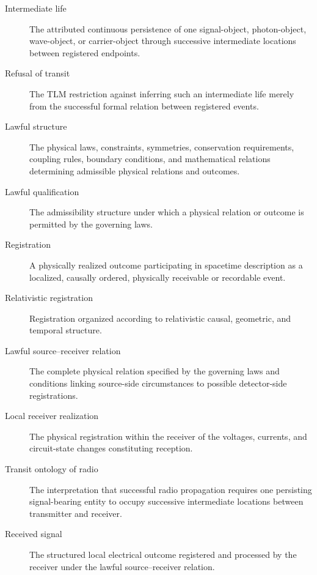 \documentclass[12pt,onecolumn]{article}
\begin{document}
\begin{description}

\item[Intermediate life]
The attributed continuous persistence of one signal-object,
photon-object, wave-object, or carrier-object through successive
intermediate locations between registered endpoints.

\item[Refusal of transit]
The TLM restriction against inferring such an intermediate life merely
from the successful formal relation between registered events.

\item[Lawful structure]
The physical laws, constraints, symmetries, conservation requirements,
coupling rules, boundary conditions, and mathematical relations
determining admissible physical relations and outcomes.

\item[Lawful qualification]
The admissibility structure under which a physical relation or outcome
is permitted by the governing laws.

\item[Registration]
A physically realized outcome participating in spacetime description as
a localized, causally ordered, physically receivable or recordable event.

\item[Relativistic registration]
Registration organized according to relativistic causal, geometric, and
temporal structure.

\item[Lawful source--receiver relation]
The complete physical relation specified by the governing laws and
conditions linking source-side circumstances to possible detector-side
registrations.

\item[Local receiver realization]
The physical registration within the receiver of the voltages, currents,
and circuit-state changes constituting reception.

\item[Transit ontology of radio]
The interpretation that successful radio propagation requires one
persisting signal-bearing entity to occupy successive intermediate
locations between transmitter and receiver.

\item[Received signal]
The structured local electrical outcome registered and processed by the
receiver under the lawful source--receiver relation.

\end{description}
\end{document}
